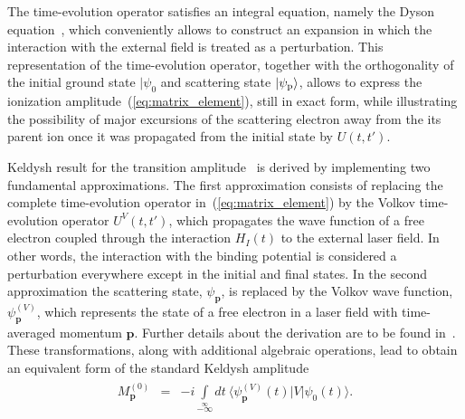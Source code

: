The time-evolution operator satisfies an integral equation, namely the
Dyson equation~\cite{Kopold_1997sfa,cjp2010_keldysh}, which
conveniently allows to construct an expansion in which the interaction
with the external field is treated as a perturbation. This
representation of the time-evolution operator, together with the
orthogonality of the initial ground state $|\psi_{0}$ and scattering
state $|\psi_{\rm{p}}\rangle$, allows to express the ionization
amplitude~(\ref{eq:matrix_element}), still in exact form, while
illustrating the possibility of major excursions of the scattering
electron away from the its parent ion once it was propagated from the
initial state by $U(t,t')$.

Keldysh result for the transition amplitude~\cite{Kopold_1997sfa} is
derived by implementing two fundamental approximations. The first
approximation consists of replacing the complete time-evolution
operator in~(\ref{eq:matrix_element}) by the Volkov time-evolution
operator $U^{V}(t,t')$, which propagates the wave function of a free
electron coupled through the interaction $H_{I}(t)$ to the external
laser field. In other words, the interaction with the binding
potential is considered a perturbation everywhere except in the
initial and final states. In the second approximation the scattering
state, $\psi_{\mathbf{p}}$, is replaced by the Volkov wave function,
$\psi_{\mathbf{p}}^{(V)}$, which represents the state of a free
electron in a laser field with time-averaged momentum
$\mathbf{p}$. Further details about the derivation are to be found
in~\cite{Kopold_1997sfa}. These transformations, along with additional
algebraic operations, lead to obtain an equivalent form of the
standard Keldysh amplitude~\cite{Kopold_1997sfa,Becker_1997}
\begin{eqnarray}
\label{eq:keldysh_amp}
\begin{split}
M_{\mathbf{p}}^{(0)} & = &
-i \int\limits_{-\infty}\limits^{\infty}
dt\ \langle \psi_{\mathbf{p}}^{(V)}(t) | V | \psi_{0}(t) \rangle.
\end{split}
\end{eqnarray}

